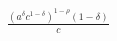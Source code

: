 $\displaystyle \frac{\left(a^{\delta} c^{1 - \delta}\right)^{1 - \rho} \left(1 - \delta\right)}{c}$
